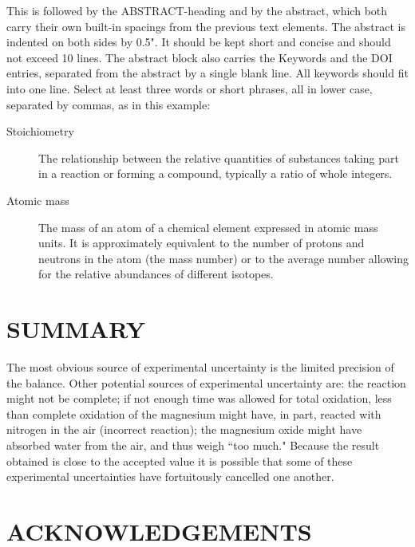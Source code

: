 \documentclass[9pt,a4paper]{article}
\begin{document}
This is followed by the ABSTRACT-heading and by the abstract, which both carry their own built-in spacings from the previous text elements. The abstract is indented on both sides by 0.5". It should be kept short and concise and should not exceed 10 lines.
The abstract block also carries the Keywords and the DOI entries, separated from the abstract by a single blank line. All keywords should fit into one line. Select at least three words or short phrases, all in lower case, separated by commas, as in this example:

\begin{description}
\item[Stoichiometry]
The relationship between the relative quantities of substances taking part in a reaction or forming a compound, typically a ratio of whole integers.
\item[Atomic mass]
The mass of an atom of a chemical element expressed in atomic mass units. It is approximately equivalent to the number of protons and neutrons in the atom (the mass number) or to the average number allowing for the relative abundances of different isotopes.
\end{description}


\section{SUMMARY}

The most obvious source of experimental uncertainty is the limited precision of the balance. Other potential sources of experimental uncertainty are: the reaction might not be complete; if not enough time was allowed for total oxidation, less than complete oxidation of the magnesium might have, in part, reacted with nitrogen in the air (incorrect reaction); the magnesium oxide might have absorbed water from the air, and thus weigh ``too much." Because the result obtained is close to the accepted value it is possible that some of these experimental uncertainties have fortuitously cancelled one another.

\section{ACKNOWLEDGEMENTS}
\end{document}
